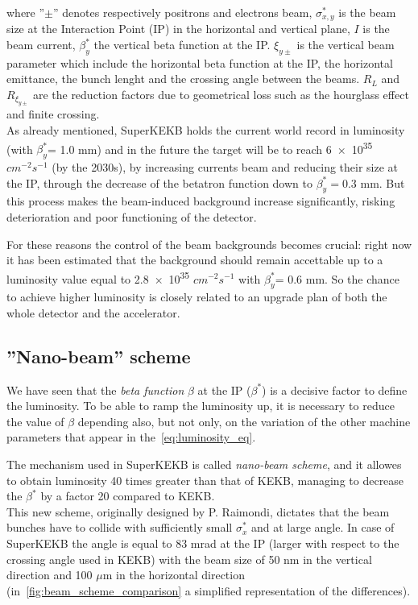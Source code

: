 where ''$\pm$'' denotes respectively positrons and electrons beam, $\sigma_{x,y}^{*}$ is the beam size at the Interaction Point (IP) in the horizontal and vertical plane, $I$ is the beam current, $\beta_{y}^{*}$ the vertical beta function at the IP. $\xi_{y\pm}$ is the vertical beam parameter which include the horizontal beta function at the IP, the horizontal emittance, the bunch lenght and the crossing angle between the beams. $R_{L}$ and $R_{\xi_{y\pm}}$ are the reduction factors due to geometrical loss such as the hourglass effect and finite crossing.\\

As already mentioned, SuperKEKB holds the current world record in luminosity (with $\beta^{*}_{y}$= 1.0 mm) and in the future the target will be to reach \num{6e35} $cm^{-2} s^{-1}$ (by the 2030s), by increasing currents beam and reducing their size at the IP, through the decrease of the betatron function down to $\beta^{*}_{y}= 0.3$ mm. But this process makes the beam-induced background increase significantly, risking deterioration and poor functioning of the detector.

For these reasons the control of the beam backgrounds becomes crucial: right now it has been estimated that the background should remain accettable up to a luminosity value equal to \num{2.8e35} $cm^{-2} s^{-1}$ with $\beta^{*}_{y}$= 0.6 mm.
So the chance to achieve higher luminosity is closely related to an upgrade plan of both the whole detector and the accelerator.


\subsection{''Nano-beam'' scheme} \label{sec:nano_beam}

We have seen that the \textit{beta function} $\beta$ at the IP ($\beta^{*}$) is a decisive factor to define the luminosity. To be able to ramp the luminosity up, it is necessary to reduce the value of $\beta$ depending also, but not only, on the variation of the other machine parameters that appear in the~\autoref{eq:luminosity_eq}.

The mechanism used in SuperKEKB is called \textit{nano-beam scheme}, and it allowes to obtain luminosity 40 times greater than that of KEKB, managing to decrease the $\beta^{*}$ by a factor 20 compared to KEKB.\\

This new scheme, originally designed by P. Raimondi\cite{Raimondi}, dictates that the beam bunches have to collide with sufficiently small $\sigma_{x}^{*}$ and at large angle. In case of SuperKEKB the angle is equal to 83 mrad at the IP (larger with respect to the crossing angle used in KEKB) with the beam size of 50 nm in the vertical direction and 100 $\mu$m in the horizontal direction (in~\autoref{fig:beam_scheme_comparison} a simplified representation of the differences).

